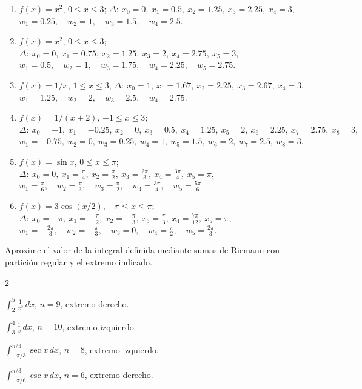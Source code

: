 \documentclass[12pt]{article}
\begin{document}
\begin{enumerate}[resume]
\item $f(x)=x^2$, $0\le x\le3$;
$\Delta:\ x_0=0,\ x_1=0.5,\ x_2=1.25,\ x_3=2.25,\ x_4=3,$ $w_1=0.25,\quad w_2=1,\quad w_3=1.5,\quad w_4=2.5.$

\item $f(x)=x^2$, $0\le x\le3$; $\Delta:\ x_0=0,\ x_1=0.75,\ x_2=1.25,\ x_3=2,\ x_4=2.75,\ x_5=3,$ $w_1=0.5,\quad w_2=1,\quad w_3=1.75,\quad w_4=2.25,\quad w_5=2.75.$

\item $f(x)=1/x$, $1\le x\le3$;
$
\Delta:\ x_0=1,\ x_1=1.67,\ x_2=2.25,\ x_3=2.67,\ x_4=3,
$
$
w_1=1.25,\quad w_2=2,\quad w_3=2.5,\quad w_4=2.75.
$

\item $f(x)=1/(x+2)$, $-1\le x\le3$;
$
\Delta:\ x_0=-1,\ x_1=-0.25,\ x_2=0,\ x_3=0.5,\ x_4=1.25,\ x_5=2,\ x_6=2.25,\ x_7=2.75,\ x_8=3,
$
$
w_1=-0.75,\ w_2=0,\ w_3=0.25,\ w_4=1,\ w_5=1.5,\ w_6=2,\ w_7=2.5,\ w_8=3.
$

\item $f(x)=\sin x$, $0\le x\le\pi$;
$
\Delta:\ x_0=0,\ x_1=\frac\pi4,\ x_2=\frac\pi2,\ x_3=\frac{2\pi}3,\ x_4=\frac{3\pi}4,\ x_5=\pi,
$
$
w_1=\frac\pi6,\quad w_2=\frac\pi3,\quad w_3=\frac\pi2,\quad w_4=\frac{3\pi}4,\quad w_5=\frac{5\pi}6.
$

\item $f(x)=3\cos(x/2)$, $-\pi\le x\le\pi$;
$
\Delta:\ x_0=-\pi,\ x_1=-\frac\pi2,\ x_2=-\frac\pi3,\ x_3=\frac\pi3,\ x_4=\frac{7\pi}{12},\ x_5=\pi,
$
$w_1=-\frac{2\pi}3,\quad w_2=-\frac\pi3,\quad w_3=0,\quad w_4=\frac\pi2,\quad w_5=\frac{2\pi}3.
$
\end{enumerate}

Aproxime el valor de la integral definida mediante sumas de Riemann con partición regular y el extremo indicado.

\begin{enumerate}[resume]
\begin{multicols}{2}
\item $\displaystyle \int_2^5\frac1{x^2}\,dx$, $n=9$, extremo derecho.
\item $\displaystyle \int_3^4\frac1x\,dx$, $n=10$, extremo izquierdo.
\item $\displaystyle \int_{-\pi/3}^{\pi/3}\sec x\,dx$, $n=8$, extremo izquierdo.
\item $\displaystyle \int_{-\pi/6}^{\pi/3}\csc x\,dx$, $n=6$, extremo derecho.
\end{multicols}
\end{enumerate}
\end{document}
